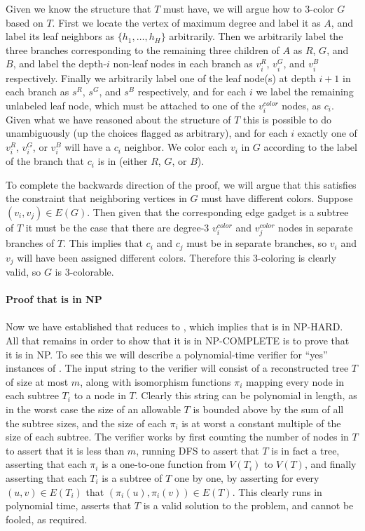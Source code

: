 Given we know the structure that $T$ must have,
we will argue how to 3-color $G$ based on $T$. First we
locate the vertex of maximum degree and label it as $A$,
and label its leaf neighbors as $\{h_1,\ldots,h_H\}$
arbitrarily. Then we arbitrarily label the three branches
corresponding to the remaining three children of $A$ as
$R$, $G$, and $B$, and label the depth-$i$ non-leaf nodes
in each branch as $v_i^R$, $v_i^G$, and $v_i^B$
respectively. Finally we arbitrarily label
one of the leaf node(s) at depth $i + 1$
in each branch as $s^R$, $s^G$, and $s^B$ respectively,
and for each $i$ we label the remaining unlabeled leaf node,
which must be attached to one of the $v_i^{color}$ nodes, as $c_i$.
Given what we have reasoned about
the structure of $T$ this is possible to do unambiguously (up
the choices flagged as arbitrary), and for
each $i$ exactly one of $v_i^R$, $v_i^G$, or $v_i^B$
will have a $c_i$ neighbor. We color each $v_i$ in $G$
according to the label of the branch that $c_i$ is in (either
$R$, $G$, or $B$).

To complete the backwards direction of the proof, we
will argue that this satisfies the constraint that neighboring
vertices in $G$ must have different colors. Suppose $(v_i, v_j) \in E(G)$.
Then given that the corresponding edge gadget is a subtree of $T$
it must be the case that there are degree-3 $v_i^{color}$
and $v_j^{color}$ nodes in separate
branches of $T$. This implies that $c_i$ and $c_j$ must be in separate
branches, so $v_i$ and $v_j$ will have been assigned different colors.
Therefore this 3-coloring is clearly valid, so $G$ is 3-colorable.\\
\\
{\bf Proof that \tr is in NP}\\
\\
Now we have established that \tc reduces to \tr, which implies
that \tr is in NP-HARD. All that remains in order to show that it is
in NP-COMPLETE is to prove that it is in NP. To see this we will
describe a polynomial-time verifier for ``yes'' instances of \tr.
The input string to the verifier will consist
of a reconstructed tree $T$ of
size at most $m$, along with isomorphism functions $\pi_i$ mapping every
node in each subtree $T_i$ to a node in $T$. Clearly this string
can be polynomial in length, as in the worst case the size of
an allowable $T$ is bounded above by the sum of all the subtree sizes,
and the size of each $\pi_i$ is at worst a constant multiple
of the size of each subtree. The verifier works by first counting
the number of nodes in $T$ to assert that it is less than $m$,
running DFS to assert that $T$ is in fact a tree, asserting that
each $\pi_i$ is a one-to-one function from $V(T_i)$ to $V(T)$,
and finally asserting that each $T_i$ is a subtree of $T$ one by one,
by asserting for every $(u, v) \in E(T_i)$ that
$(\pi_i(u), \pi_i(v)) \in E(T)$. This clearly runs in polynomial time, 
asserts that $T$ is a valid solution to the problem, and
cannot be fooled, as required.



